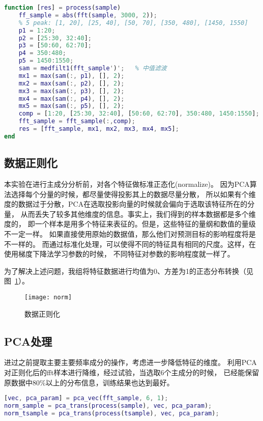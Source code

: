 \begin{lstlisting}[language=Matlab]
function [res] = process(sample)
	ff_sample = abs(fft(sample, 3000, 2));
	% 5 peak: [1, 20], [25, 40], [50, 70], [350, 480], [1450, 1550]
	p1 = 1:20;
	p2 = [25:30, 32:40];
	p3 = [50:60, 62:70];
	p4 = 350:480;
	p5 = 1450:1550;
	sam = medfilt1(fft_sample')';	% 中值滤波
	mx1 = max(sam(:, p1), [], 2);
	mx2 = max(sam(:, p2), [], 2);
	mx3 = max(sam(:, p3), [], 2);
	mx4 = max(sam(:, p4), [], 2);
	mx5 = max(sam(:, p5), [], 2);
	comp = [1:20, [25:30, 32:40], [50:60, 62:70], 350:480, 1450:1550];
	fft_sample = fft_sample(:,comp);
	res = [fft_sample, mx1, mx2, mx3, mx4, mx5];
end
\end{lstlisting}

\subsection{数据正则化}

本实验在进行主成分分析前，对各个特征做标准正态化(normalize)。
因为PCA算法选择每个分量的时候，都尽量使得投影其上的数据尽量分散，
所以如果有个维度的数据过于分散，PCA在选取投影向量的时候就会偏向于选取该特征所在的分量，
从而丢失了较多其他维度的信息。事实上，我们得到的样本数据都是多个维度的，
即一个样本是用多个特征来表征的。但是，这些特征的量纲和数值的量级不一定一样。
如果直接使用原始的数据值，那么他们对预测目标的影响程度将是不一样的。
而通过标准化处理，可以使得不同的特征具有相同的尺度。这样，在使用梯度下降法学习参数的时候，
不同特征对参数的影响程度就一样了。

为了解决上述问题，我组将特征数据进行均值为0、方差为1的正态分布转换（见图~\ref{fig:norm}）。

\begin{figure}[ht]
	\centering
	\texttt{[image: norm]}
	\caption{数据正则化}
	\label{fig:norm}
\end{figure}

\subsection{PCA处理}

进过之前提取主要主要频率成分的操作，考虑进一步降低特征的维度。
利用PCA对正则化后的fft样本进行降维，经过试验，当选取6个主成分的时候，
已经能保留原数据中80\%以上的分布信息，训练结果也达到最好。

\begin{lstlisting}[language=Matlab]
[vec, pca_param] = pca_vec(fft_sample, 6, 1);
norm_sample = pca_trans(process(sample), vec, pca_param);
norm_tsample = pca_trans(process(tsample), vec, pca_param);
\end{lstlisting}

